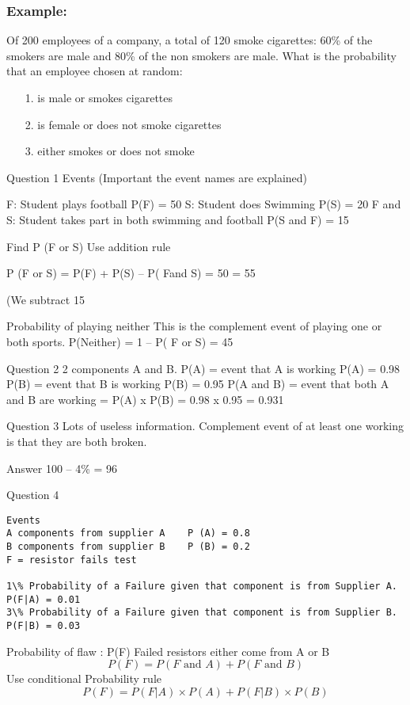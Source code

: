 \documentclass[]{report}
\begin{document}
\subsubsection{Example:}
Of 200 employees of a company, a total of 120 smoke cigarettes:
60\% of the smokers are male and 80\% of the non smokers are
male. What is the probability that an employee chosen at random:
\begin{itemize}
	\item[1.]  is male or smokes cigarettes
	\item[2.] is female or does not smoke cigarettes
	\item[3.] either smokes or does not smoke
\end{itemize}




Question 1
Events  (Important the event names are explained)

F: 		Student plays football			P(F) = 50%
S: 		Student does Swimming		P(S) = 20%
F and S:            Student takes part in both swimming and football  
P(S and F) = 15%

Find P (F or S)
Use addition rule

P (F or S)  =  P(F) + P(S) – P( Fand S)
=  50%
=   55%

(We subtract 15%

Probability of playing neither
This is the complement event of playing one or both sports.
P(Neither) = 1 –  P( F or S)  = 45%

Question 2 
2 components A and B.
P(A) = event that A is working		P(A) = 0.98
P(B) = event that B is working			P(B) = 0.95
P(A and B) = event that both A and B are working = P(A) x P(B) = 0.98 x 0.95 = 0.931

Question 3
Lots of useless information.
Complement event of at least one working is that they are both broken.

Answer  100 – 4\% = 96%

Question 4


\begin{verbatim}
Events 
A components from supplier A  	P (A) = 0.8 
B components from supplier B  	P (B) = 0.2 
F = resistor fails test

1\% Probability of a Failure given that component is from Supplier A.      P(F|A) = 0.01
3\% Probability of a Failure given that component is from Supplier B.      P(F|B) = 0.03

\end{verbatim}
Probability of flaw : P(F)
Failed resistors either come from A or B
\[	P( F) =  P ( F \mbox{ and } A)  +  P( F \mbox{ and } B)\]
Use conditional Probability  rule		
\[P(F) = P(F|A)\times P(A)  + P(F|B)\times P(B)\]
\end{document}

